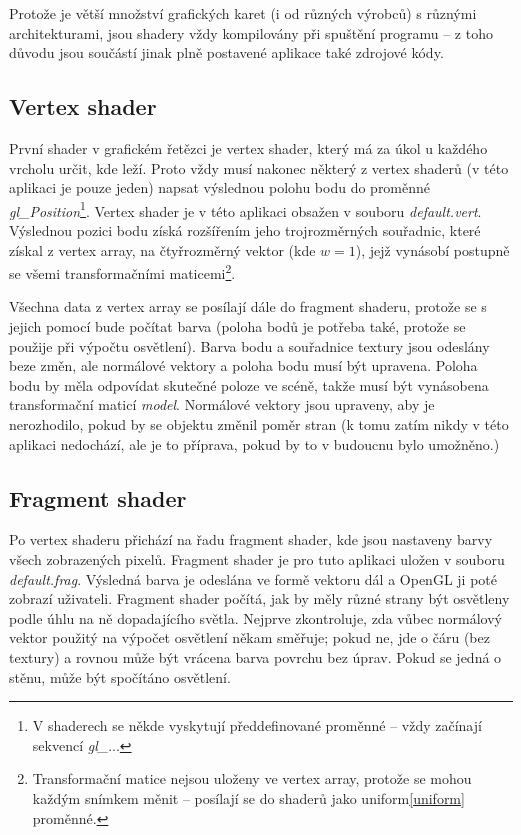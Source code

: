 \documentclass[a4paper, 11pt]{report}
\begin{document}
Protože je větší množství grafických karet (i od různých výrobců) s různými architekturami, jsou shadery vždy kompilovány při spuštění programu -- z toho důvodu jsou součástí jinak plně postavené aplikace také zdrojové kódy.

\subsection{Vertex shader}
První shader v grafickém řetězci je vertex shader, který má za úkol u každého vrcholu určit, kde leží. Proto vždy musí nakonec některý z vertex shaderů (v této aplikaci je pouze jeden) napsat výslednou polohu bodu do proměnné \emph{gl\_Position}\footnote{V shaderech se někde vyskytují předdefinované proměnné -- vždy začínají sekvencí \emph{gl\_}...}. Vertex shader je v této aplikaci obsažen v souboru \emph{default.vert}. Výslednou pozici bodu získá rozšířením jeho trojrozměrných souřadnic, které získal z vertex array, na čtyřrozměrný vektor (kde \(w=1\)), jejž vynásobí postupně se všemi transformačními maticemi\footnote{Transformační matice nejsou uloženy ve vertex array, protože se mohou každým snímkem měnit -- posílají se do shaderů jako uniform\cref{uniform} proměnné.}.

Všechna data z vertex array se posílají dále do fragment shaderu, protože se s jejich pomocí bude počítat barva (poloha bodů je potřeba také, protože se použije při výpočtu osvětlení). Barva bodu a souřadnice textury jsou odeslány beze změn, ale normálové vektory a poloha bodu musí být upravena. Poloha bodu by měla odpovídat skutečné poloze ve scéně, takže musí být vynásobena transformační maticí \emph{model}. Normálové vektory jsou upraveny, aby je nerozhodilo, pokud by se objektu změnil poměr stran (k tomu zatím nikdy v této aplikaci nedochází, ale je to příprava, pokud by to v budoucnu bylo umožněno.)

\subsection{Fragment shader}
Po vertex shaderu přichází na řadu fragment shader, kde jsou nastaveny barvy všech zobrazených pixelů. Fragment shader je pro tuto aplikaci uložen v souboru \emph{default.frag}. Výsledná barva je odeslána ve formě vektoru dál a OpenGL ji poté zobrazí uživateli. Fragment shader počítá, jak by měly různé strany být osvětleny podle úhlu na ně dopadajícího světla. Nejprve zkontroluje, zda vůbec normálový vektor použitý na výpočet osvětlení někam směřuje; pokud ne, jde o čáru (bez textury) a rovnou může být vrácena barva povrchu bez úprav. Pokud se jedná o stěnu, může být spočítáno osvětlení.
\end{document}
